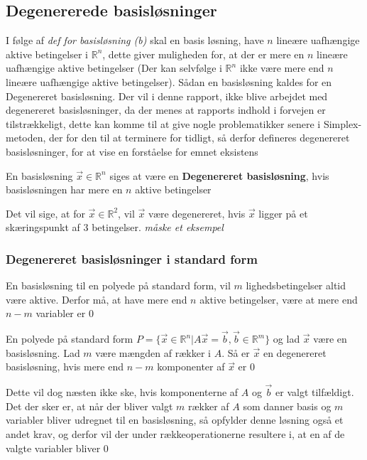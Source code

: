 \subsection{Degenererede basisløsninger}
I følge af \textit{def for basisløsning (b)} skal en basis løsning, have $n$ lineære uafhængige aktive betingelser i $\mathds{R}^n$, dette giver muligheden for, at der er mere en $n$ lineære uafhængige aktive betingelser (Der kan selvfølge i $\mathds{R}^n$ ikke være mere end $n$ lineære uafhængige aktive betingelser). Sådan en basisløsning kaldes for en Degenereret basisløsning. Der vil i denne rapport, ikke blive arbejdet med degenereret basisløsninger, da der menes at rapports indhold i forvejen er tilstrækkeligt, dette kan komme til at give nogle problematikker senere i Simplex-metoden, der for den til at terminere for tidligt, så derfor defineres degenereret basisløsninger, for at vise en forståelse for emnet eksistens
\begin{defn}
En basisløsning $\vec{x}\in \mathds{R}^n$ siges at være en \textbf{Degenereret basisløsning}, hvis basisløsningen har mere en $n$ aktive betingelser
\end{defn}

Det vil sige, at for $\vec{x}\in \mathds{R}^2$, vil $\vec{x}$ være degenereret, hvis $\vec{x}$ ligger på et skæringspunkt af $3$ betingelser.
\textit{måske et eksempel}\\
\subsubsection{Degenereret basisløsninger i standard form}
En basisløsning til en polyede på standard form, vil $m$ lighedsbetingelser altid være aktive. Derfor må, at have mere end $n$ aktive betingelser, være at mere end $n-m$ variabler er $0$
\begin{defn}
En polyede på standard form $P =\{ \vec{x} \in \mathds{R}^n | A \vec{x} = \vec{b}, \vec{b}\in \mathds{R}^m\}$ og lad $\vec{x}$ være en basisløsning. Lad $m$ være mængden af rækker i $A$. Så er $\vec{x}$ en degenereret basisløsning, hvis mere end $n-m$ komponenter af $\vec{x}$ er $0$
\end{defn}
Dette vil dog næsten ikke ske, hvis komponenterne af $A$ og $\vec{b}$ er valgt tilfældigt.
Det der sker er, at når der bliver valgt $m$ rækker af $A$ som danner basis og $m$ variabler bliver udregnet til en basisløsning, så opfylder denne løsning også et andet krav, og derfor vil der under rækkeoperationerne resultere i, at en af de valgte variabler bliver $0$